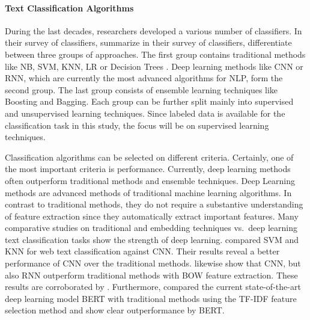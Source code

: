 \documentclass[12pt, a4paper, titlepage]{article}
\begin{document}
\paragraph{Text Classification Algorithms}
During the last decades, researchers developed a various number of classifiers. In their survey of classifiers, \cite{kowsari2019text} summarize in their survey of classifiers, differentiate between three groups of approaches. The first group contains traditional methods like \ac{NB}, \ac{SVM}, \ac{KNN}, \ac{LR} or Decision Trees \citep{Vijayan2017, Colas2006, kowsari2019text, Sebastiani2001}. Deep learning methods like \ac{CNN} or \ac{RNN}, which are currently the most advanced algorithms for \ac{NLP}, form the second group. The last group consists of ensemble learning techniques like Boosting and Bagging. Each group can be further split mainly into supervised and unsupervised learning techniques. Since labeled data is available for the classification task in this study, the focus will be on supervised learning techniques. 

Classification algorithms can be selected on different criteria. Certainly, one of the most important criteria is performance. Currently, deep learning methods often outperform traditional methods and ensemble techniques. Deep Learning methods are advanced methods of traditional machine learning algorithms. In contrast to traditional methods, they do not require a substantive understanding of feature extraction since they automatically extract important features. Many comparative studies on traditional and embedding techniques vs.\ deep learning text classification tasks show the strength of deep learning. \citet{wang2017} compared \ac{SVM} and \ac{KNN} for web text classification against \ac{CNN}. Their results reveal a better performance of \ac{CNN} over the traditional methods. \citet{hassan2017} likewise show that \ac{CNN}, but also \ac{RNN} outperform traditional methods with \ac{BOW} feature extraction. These results are corroborated by \citet{kamath2018}. Furthermore, \citet{gonzalez2020} compared the current state-of-the-art deep learning model \ac{BERT} with traditional methods using the \ac{TF-IDF} feature selection method and show clear outperformance by \ac{BERT}. 
\end{document}
